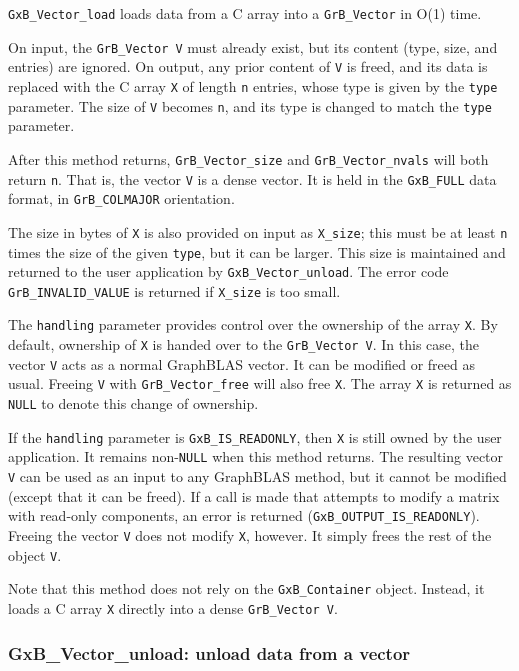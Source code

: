 \verb'GxB_Vector_load' loads data from a C array into a \verb'GrB_Vector' in
O(1) time.

On input, the \verb'GrB_Vector V' must already exist, but its content (type,
size, and entries) are ignored.  On output, any prior content of \verb'V' is
freed, and its data is replaced with the C array \verb'X' of length \verb'n'
entries, whose type is given by the \verb'type' parameter.  The size of
\verb'V' becomes \verb'n', and its type is changed to match the \verb'type'
parameter.

After this method returns, \verb'GrB_Vector_size' and \verb'GrB_Vector_nvals' 
will both return \verb'n'.  That is, the vector \verb'V' is a dense vector.
It is held in the \verb'GxB_FULL' data format, in \verb'GrB_COLMAJOR'
orientation.

The size in bytes of \verb'X' is also provided on input as \verb'X_size'; this
must be at least \verb'n' times the size of the given \verb'type', but it can
be larger.  This size is maintained and returned to the user application by
\verb'GxB_Vector_unload'.  The error code \verb'GrB_INVALID_VALUE' is returned
if \verb'X_size' is too small.

The \verb'handling' parameter provides control over the ownership of the array
\verb'X'.  By default, ownership of \verb'X' is handed over to the
\verb'GrB_Vector V'.  In this case, the vector \verb'V' acts as a normal
GraphBLAS vector.  It can be modified or freed as usual.  Freeing \verb'V' with
\verb'GrB_Vector_free' will also free \verb'X'.  The array \verb'X' is returned
as \verb'NULL' to denote this change of ownership.

If the \verb'handling' parameter is \verb'GxB_IS_READONLY', then \verb'X' is
still owned by the user application.  It remains non-\verb'NULL' when this
method returns.  The resulting vector \verb'V' can be used as an input to any
GraphBLAS method, but it cannot be modified (except that it can be freed).
If a call is made that attempts to modify a matrix with read-only components,
an error is returned (\verb'GxB_OUTPUT_IS_READONLY').
Freeing the vector \verb'V' does not modify \verb'X', however.  It simply
frees the rest of the object \verb'V'.

Note that this method does not rely on the \verb'GxB_Container' object.
Instead, it loads a C array \verb'X' directly into a dense \verb'GrB_Vector V'.

\subsubsection{{\sf GxB\_Vector\_unload:} unload data from a vector}
\label{vector_unload}

